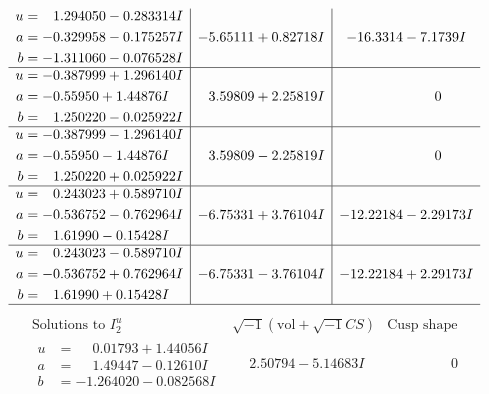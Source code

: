 \documentclass[1p]{elsarticle_modified}
\theoremstyle{definition}
\newcommand{\I}{\sqrt{-1}}
\begin{document}
$$\begin{array}{c|c|c}
\begin{aligned}
u &= \phantom{-}1.294050 - 0.283314 I \\
a &= -0.329958 - 0.175257 I \\
b &= -1.311060 - 0.076528 I\end{aligned}
 & -5.65111 + 0.82718 I & -16.3314 - 7.1739 I \\ \hline\begin{aligned}
u &= -0.387999 + 1.296140 I \\
a &= -0.55950 + 1.44876 I \\
b &= \phantom{-}1.250220 - 0.025922 I\end{aligned}
 & \phantom{-}3.59809 + 2.25819 I & \phantom{-0.000000 } 0 \\ \hline\begin{aligned}
u &= -0.387999 - 1.296140 I \\
a &= -0.55950 - 1.44876 I \\
b &= \phantom{-}1.250220 + 0.025922 I\end{aligned}
 & \phantom{-}3.59809 - 2.25819 I & \phantom{-0.000000 } 0 \\ \hline\begin{aligned}
u &= \phantom{-}0.243023 + 0.589710 I \\
a &= -0.536752 - 0.762964 I \\
b &= \phantom{-}1.61990 - 0.15428 I\end{aligned}
 & -6.75331 + 3.76104 I & -12.22184 - 2.29173 I \\ \hline\begin{aligned}
u &= \phantom{-}0.243023 - 0.589710 I \\
a &= -0.536752 + 0.762964 I \\
b &= \phantom{-}1.61990 + 0.15428 I\end{aligned}
 & -6.75331 - 3.76104 I & -12.22184 + 2.29173 I\\
 \hline 
 \end{array}$$\newpage$$\begin{array}{c|c|c}  
\text{Solutions to }I^u_{2}& \I (\text{vol} + \sqrt{-1}CS) & \text{Cusp shape}\\
 \hline 
\begin{aligned}
u &= \phantom{-}0.01793 + 1.44056 I \\
a &= \phantom{-}1.49447 - 0.12610 I \\
b &= -1.264020 - 0.082568 I\end{aligned}
 & \phantom{-}2.50794 - 5.14683 I & \phantom{-0.000000 } 0 \\ \hline\begin{aligned}

\end{aligned}
\end{array}$$
\end{document}
